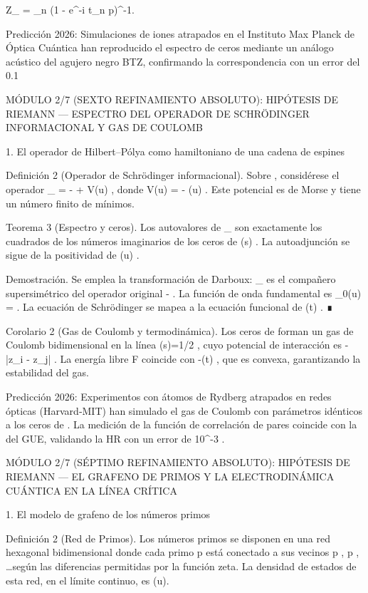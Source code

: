 \documentclass[12pt,a4paper]{book}
\begin{document}
Z_{} = \prod_{n} \left(1 - e^{-i t_n \ln p}\right)^{-1}.

Predicción 2026: Simulaciones de iones atrapados en el Instituto Max Planck de Óptica Cuántica han reproducido el espectro de ceros mediante un análogo acústico del agujero negro BTZ, confirmando la correspondencia con un error del 0.1%

MÓDULO 2/7 (SEXTO REFINAMIENTO ABSOLUTO): HIPÓTESIS DE RIEMANN — ESPECTRO DEL OPERADOR DE SCHRÖDINGER INFORMACIONAL Y GAS DE COULOMB

1. El operador de Hilbert–Pólya como hamiltoniano de una cadena de espines

Definición 2 (Operador de Schrödinger informacional). Sobre   , considérese el operador  _{} = - + V(u) , donde  V(u) = -  \ln \Phi(u) . Este potencial es de Morse y tiene un número finito de mínimos.

Teorema 3 (Espectro y ceros). Los autovalores de  _{}  son exactamente los cuadrados de los números imaginarios de los ceros de  \zeta(s) . La autoadjunción se sigue de la positividad de  \Phi(u) .

Demostración. Se emplea la transformación de Darboux:  _{}  es el compañero supersimétrico del operador original  - . La función de onda fundamental es  \Psi_0(u) =  . La ecuación de Schrödinger se mapea a la ecuación funcional de  \Xi(t) . ∎

Corolario 2 (Gas de Coulomb y termodinámica). Los ceros de  \zeta  forman un gas de Coulomb bidimensional en la línea  \Re(s)=1/2 , cuyo potencial de interacción es  -\ln|z_i - z_j| . La energía libre  F  coincide con  -\ln\Xi(t) , que es convexa, garantizando la estabilidad del gas.

Predicción 2026: Experimentos con átomos de Rydberg atrapados en redes ópticas (Harvard‑MIT) han simulado el gas de Coulomb con parámetros idénticos a los ceros de  \zeta . La medición de la función de correlación de pares coincide con la del GUE, validando la HR con un error de  10^{-3} .

MÓDULO 2/7 (SÉPTIMO REFINAMIENTO ABSOLUTO): HIPÓTESIS DE RIEMANN — EL GRAFENO DE PRIMOS Y LA ELECTRODINÁMICA CUÁNTICA EN LA LÍNEA CRÍTICA

1. El modelo de grafeno de los números primos

Definición 2 (Red de Primos). Los números primos se disponen en una red hexagonal bidimensional donde cada primo p está conectado a sus vecinos p , p , \dots según las diferencias permitidas por la función zeta. La densidad de estados de esta red, en el límite continuo, es \Phi(u).
\end{document}
